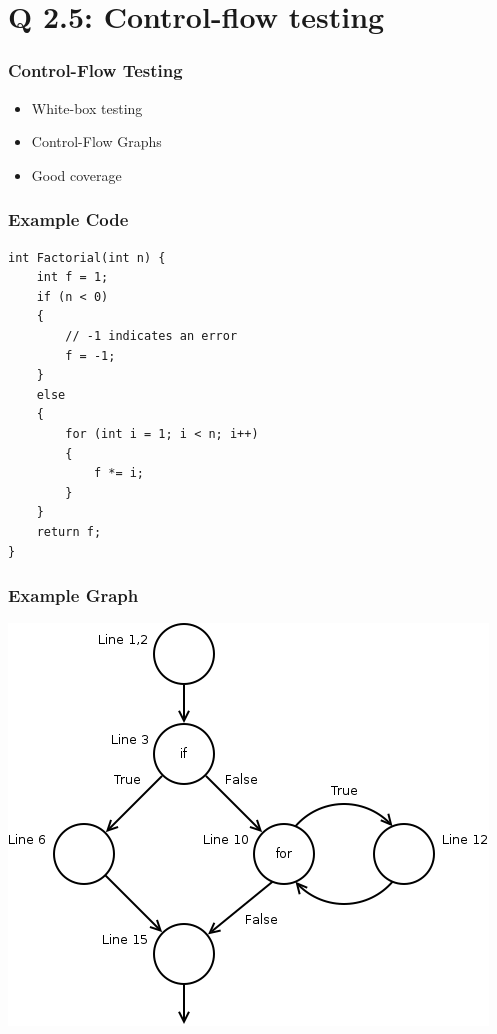 
\section{Q 2.5: Control-flow testing}

\begin{frame}
    \frametitle{Control-Flow Testing}
    \begin{itemize}
        \item White-box testing
        \item Control-Flow Graphs
        \item Good coverage
    \end{itemize}
\end{frame}

\begin{frame}[fragile]
    \frametitle{Example Code}
    \begin{verbatim}
int Factorial(int n) {
    int f = 1;
    if (n < 0)
    {
        // -1 indicates an error
        f = -1;
    }
    else
    {
        for (int i = 1; i < n; i++)
        {
            f *= i;
        }
    }
    return f;
}
    \end{verbatim}
\end{frame}

\begin{frame}
    \frametitle{Example Graph}
    \centering
    \includegraphics[scale=0.4]{state_transition.png}
\end{frame}

